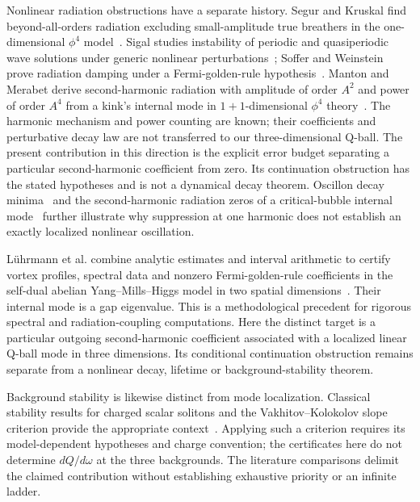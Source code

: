 Nonlinear radiation obstructions have a separate history. Segur and
Kruskal find beyond-all-orders radiation excluding small-amplitude true
breathers in the one-dimensional $\phi^4$
model~\cite{SegurKruskal1987}. Sigal studies instability of periodic and
quasiperiodic wave solutions under generic nonlinear
perturbations~\cite{Sigal1993}; Soffer and Weinstein prove radiation
damping under a Fermi-golden-rule hypothesis~\cite{SofferWeinstein1999}.
Manton and Merabet derive second-harmonic radiation with amplitude of
order $A^2$ and power of order $A^4$ from a kink's internal mode in
$1+1$-dimensional $\phi^4$ theory~\cite[Appendix A]{MantonMerabet1997}.
The harmonic mechanism and power counting are known; their coefficients
and perturbative decay law are not transferred to our three-dimensional
Q-ball.
The present contribution in this direction is the explicit error budget
separating a particular second-harmonic coefficient from zero. Its
continuation obstruction has the stated hypotheses and is not a
dynamical decay theorem. Oscillon decay minima~\cite{ZhangOscillons2020}
and the second-harmonic radiation zeros of a critical-bubble internal
mode~\cite{InagakiMurakami2026} further illustrate why suppression at one
harmonic does not establish an exactly localized nonlinear oscillation.

L\"uhrmann et al. combine analytic estimates and interval arithmetic to
certify vortex profiles, spectral data and nonzero Fermi-golden-rule
coefficients in the self-dual abelian Yang--Mills--Higgs model in two
spatial dimensions~\cite[Theorem 1.1, Remark 1.2 and Section 2]{LuhrmannEtAl2026}.
Their internal mode is a gap eigenvalue. This is a methodological
precedent for rigorous spectral and radiation-coupling computations.
Here the distinct target is a particular outgoing second-harmonic
coefficient associated with a localized linear Q-ball mode in three
dimensions. Its conditional continuation obstruction remains separate
from a nonlinear decay, lifetime or background-stability theorem.

Background stability is likewise distinct from mode localization.
Classical stability results for charged scalar solitons and the
Vakhitov--Kolokolov slope criterion provide the appropriate
context~\cite{FriedbergLeeSirlin1976,VakhitovKolokolov1973}.
Applying such a criterion requires its model-dependent hypotheses and
charge convention; the certificates here do not determine $dQ/d\omega$
at the three backgrounds. The literature comparisons delimit the claimed
contribution without establishing exhaustive priority or an infinite
ladder.
